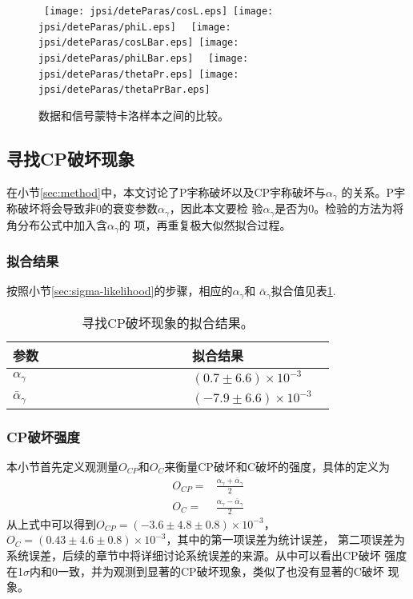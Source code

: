 \begin{figure}[htbp]
    \centering
    \mbox{%
       \texttt{[image: jpsi/deteParas/cosL.eps]}
       \texttt{[image: jpsi/deteParas/phiL.eps]}
   }
   \mbox{%
       \texttt{[image: jpsi/deteParas/cosLBar.eps]}
       \texttt{[image: jpsi/deteParas/phiLBar.eps]}
   }
   \mbox{%
       \texttt{[image: jpsi/deteParas/thetaPr.eps]}
       \texttt{[image: jpsi/deteParas/thetaPrBar.eps]}
   }
    \caption{数据和信号蒙特卡洛样本之间的比较。}%
    \label{fig:compare2}
\end{figure}
\subsection{寻找CP破坏现象}
在小节\ref{sec:method}中，本文讨论了P宇称破坏以及CP宇称破坏与$\alpha_{\gamma}$
的关系。P宇称破坏将会导致非0的衰变参数$\alpha_{\gamma}$，因此本文要检
验$\alpha_{\gamma}$是否为0。检验的方法为将角分布公式中加入含$\alpha_{\gamma}$的
项，再重复极大似然拟合过程。

\subsubsection*{拟合结果}
按照小节\ref{sec:sigma-likelihood}的步骤，相应的$\alpha_{\gamma}$和
$\bar{\alpha}_{\gamma}$拟合值见表\ref{tab:alphaS}.

\begin{table}[htbp]
    \caption{寻找CP破坏现象的拟合结果。}%
    \label{tab:alphaS}
    \begin{center}
        \begin{tabular} {p{0.5 \linewidth} p{0.3\linewidth}}
            \toprule
            参数 & 拟合结果 \\ 
            \midrule
            $\alpha_{\gamma}$ &  $(0.7 \pm 6.6) \times 10 ^{-3}$ \\ 
            $\bar{\alpha}_{\gamma}$ & $( -7.9 \pm 6.6) \times 10^{-3}$ \\
            \bottomrule
        \end{tabular}
    \end{center}
\end{table}
\subsubsection*{CP破坏强度}
本小节首先定义观测量$O_{CP}$和$O_{C}$来衡量CP破坏和C破坏的强度，具体的定义为
\begin{equation}
    \begin{aligned}
        O_{CP}  =& \frac{\alpha_{\gamma} + \bar{\alpha}_{\gamma}}{2} \\
        O_{C}  =& \frac{\alpha_{\gamma} - \bar{\alpha}_{\gamma}}{2} 
    \end{aligned}
\end{equation}
从上式中可以得到$O_{CP} = (-3.6 \pm 4.8 \pm 0.8)\times 10^{-3}$，
$O_{C} = (0.43 \pm 4.6 \pm 0.8)\times 10^{-3}$，其中的第一项误差为统计误差，
第二项误差为系统误差，后续的章节中将详细讨论系统误差的来源。从中可以看出CP破坏
强度在1$\sigma$内和0一致，并为观测到显著的CP破坏现象，类似了也没有显著的C破坏
现象。

